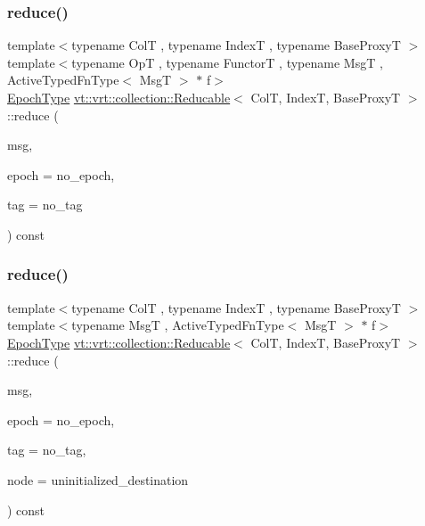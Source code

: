 \subsubsection{\texorpdfstring{reduce()}{reduce()}\hspace{0.1cm}{\footnotesize\ttfamily [2/4]}}
{\footnotesize\ttfamily template$<$typename ColT , typename IndexT , typename Base\+ProxyT $>$ \\
template$<$typename OpT , typename FunctorT , typename MsgT , Active\+Typed\+Fn\+Type$<$ Msg\+T $>$ $\ast$ f$>$ \\
\hyperlink{namespacevt_a985a5adf291c34a3ca263b3378388236}{Epoch\+Type} \hyperlink{structvt_1_1vrt_1_1collection_1_1_reducable}{vt\+::vrt\+::collection\+::\+Reducable}$<$ ColT, IndexT, Base\+ProxyT $>$\+::reduce (\begin{DoxyParamCaption}\item[{MsgT $\ast$const}]{msg,  }\item[{\hyperlink{namespacevt_a985a5adf291c34a3ca263b3378388236}{Epoch\+Type} const \&}]{epoch = {\ttfamily no\+\_\+epoch},  }\item[{\hyperlink{namespacevt_a84ab281dae04a52a4b243d6bf62d0e52}{Tag\+Type} const \&}]{tag = {\ttfamily no\+\_\+tag} }\end{DoxyParamCaption}) const}

\mbox{\label{structvt_1_1vrt_1_1collection_1_1_reducable_a4bf1d380e884ea2568626a6195cba321}} 
\subsubsection{\texorpdfstring{reduce()}{reduce()}\hspace{0.1cm}{\footnotesize\ttfamily [3/4]}}
{\footnotesize\ttfamily template$<$typename ColT , typename IndexT , typename Base\+ProxyT $>$ \\
template$<$typename MsgT , Active\+Typed\+Fn\+Type$<$ Msg\+T $>$ $\ast$ f$>$ \\
\hyperlink{namespacevt_a985a5adf291c34a3ca263b3378388236}{Epoch\+Type} \hyperlink{structvt_1_1vrt_1_1collection_1_1_reducable}{vt\+::vrt\+::collection\+::\+Reducable}$<$ ColT, IndexT, Base\+ProxyT $>$\+::reduce (\begin{DoxyParamCaption}\item[{MsgT $\ast$const}]{msg,  }\item[{\hyperlink{namespacevt_a985a5adf291c34a3ca263b3378388236}{Epoch\+Type} const \&}]{epoch = {\ttfamily no\+\_\+epoch},  }\item[{\hyperlink{namespacevt_a84ab281dae04a52a4b243d6bf62d0e52}{Tag\+Type} const \&}]{tag = {\ttfamily no\+\_\+tag},  }\item[{\hyperlink{namespacevt_a866da9d0efc19c0a1ce79e9e492f47e2}{Node\+Type} const \&}]{node = {\ttfamily uninitialized\+\_\+destination} }\end{DoxyParamCaption}) const}

